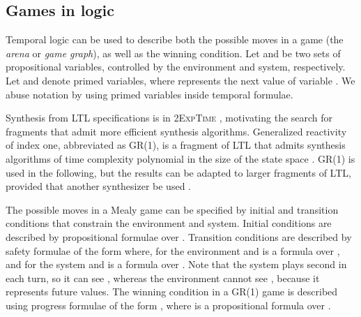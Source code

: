 \documentclass[copyright]{eptcs}
\begin{document}
\subsection{Games in logic}
\label{sec:games-in-logic}

Temporal logic can be used to describe both the possible moves in a game (the {\em arena} or {\em game graph}), as well as the winning condition.
Let  and  be two sets of propositional variables, controlled by the environment and system, respectively.
Let  and  denote primed variables, where  represents the next value  of variable .
We abuse notation by using primed variables inside temporal formulae.

Synthesis from LTL specifications is in \textsc{2ExpTime} \cite{Pnueli89icalp,Rosner92}, motivating the search for fragments that admit more efficient synthesis algorithms.
Generalized reactivity of index one, abbreviated as GR(1), is a fragment of LTL that admits synthesis algorithms of time complexity polynomial in the size of the state space \cite{Bloem12jcss}.
GR(1) \cite{Jobstmann07cav,Pnueli10cav,Bloem10cav,Livingston12icra,Ehlers14synt} is used in the following, but the results can be adapted to larger fragments of LTL, provided that another synthesizer be used \cite{Jobstmann06fmcad,Ehlers11tacas,Ehlers2011wigp,Bohy12cav,Filippidis13list}.

The possible moves in a Mealy game can be specified by initial and transition conditions that constrain the environment and system.
Initial conditions are described by propositional formulae over .
Transition conditions are described by safety formulae of the form  where, for the environment  and  is a formula over , and for the system  and  is a formula over .
Note that the system plays second in each turn, so it can see , whereas the environment cannot see , because it represents future values.
The winning condition in a GR(1) game is described using progress formulae of the form , where  is a propositional formula over .
\end{document}
